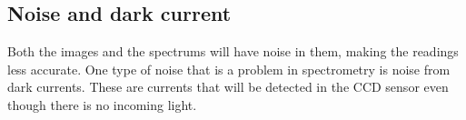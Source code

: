 
\subsection{Noise and dark current}
\label{sec:noise_and_dark_current}
Both the images and the spectrums will have noise in them, making the readings less accurate. One type of noise that is a problem in spectrometry is noise from dark currents. These are currents that will be detected in the CCD sensor even though there is no incoming light. 



% 